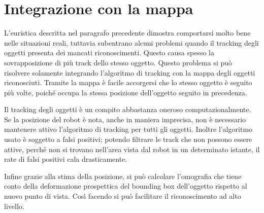 \section{Integrazione con la mappa}
L'euristica descritta nel paragrafo precedente dimostra comportarsi molto bene nelle situazioni reali, tuttavia subentrano alcuni problemi quando il tracking degli oggetti presenta dei mancati riconoscimenti. Questo causa spesso la sovrapposizione di più track dello stesso oggetto. Questo problema si può risolvere solamente integrando l'algoritmo di tracking con la mappa degli oggetti riconosciuti. Tramite la mappa è facile accorgersi che lo stesso oggetto è seguito più volte, poiché occupa la stessa posizione dell'oggetto seguito in precedenza.

Il tracking degli oggetti è un compito abbastanza oneroso computazionalmente. Se la posizione del robot è nota, anche in maniera imprecisa, non è necessario mantenere attivo l'algoritmo di tracking per tutti gli oggetti. Inoltre l'algoritmo usato è soggetto a falsi positivi; potendo filtrare le track che non possono essere attive, perché non si trovano nell'area vista dal robot in un determinato istante, il rate di falsi positivi cala drasticamente.

Infine grazie alla stima della posizione, si può calcolare l'omografia che tiene conto della deformazione prospettica del bounding box dell'oggetto rispetto al nuovo punto di vista. Così facendo si può facilitare il riconoscimento ad alto livello.

